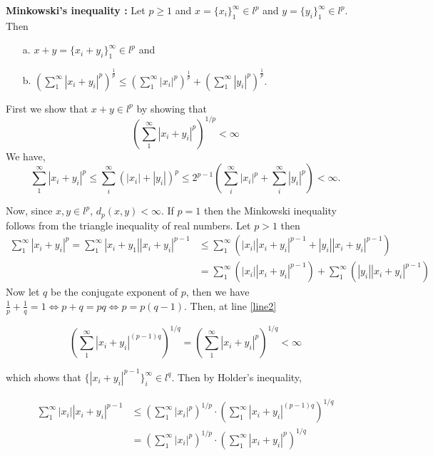 \documentclass[12pt]{article}
\begin{document}
\begin{enumerate}
\begin{mybox}
    \textbf{Minkowski's inequality :} Let $p\geq 1$ and
    $x=\{x_{i}\}_{1}^{\infty} \in l^p$ and
    $y=\{y_{i}\}_{1}^{\infty} \in l^p$. Then

    \begin{enumerate}
        \item[a.]
              $x+y =
              \{x_{i} + y_{i}\}_{1}^{\infty} \in l^{p}$ and
        \item[b.]
        $\left(\sum_{1}^{\infty}{|x_{i} + y_{i}|^p}\right)^
        \frac{1}{p}\leq
        \left(\sum_{1}^{\infty}{|x_{i}|^{p}}\right)^{\frac{1}{p}}
        +
        \left(\sum_{1}^{\infty}{|y_{i}|^{p}}\right)^{\frac{1}{p}}.$
    \end{enumerate}
    First we show that $x+y\in l^p$ by showing that
    $$\left(\sum_{1}^{\infty}{|x_{i} + y_{i}|^p}\right)^{1/p}
    <\infty$$
    We have,
    $$\sum_{1}^{\infty}{|x_{i} + y_{i}|^p}\leq
    \sum_i^{\infty}{\left(|x_i|+|y_i|\right)^p}\leq
    2^{p-1}\left(\sum_i^{\infty}{|x_i|^p}+
    \sum_i^{\infty}{|y_i|^p}\right)<\infty.$$

    Now, since $x,y\in l^p$, $d_p(x,y)<\infty$.
    If $p=1$ then the Minkowski inequality follows from the
    triangle inequality of real numbers. Let $p>1$ then
    \begin{align}\sum_{1}^{\infty}{|x_{i} + y_{i}|^p}=
    \sum_{1}^{\infty}{|x_i+y_1||x_{i} + y_{i}|^{p-1}}
    &\leq\sum_{1}^{\infty}{\left(|x_i||x_{i} + y_{i}|^{p-1}
    +|y_i||x_{i} + y_{i}|^{p-1}\right)}\label{line1}\\
    &=\sum_{1}^{\infty}{\left(|x_i||x_{i} + y_{i}|^{p-1}\right)}
    +\sum_{1}^{\infty}{\left(|y_i||x_{i} + y_{i}|^{p-1}\right)}
    \label{line2}
    \end{align}
    Now let $q$ be the conjugate exponent of $p$, then we have
    $\frac{1}{p}+\frac{1}{q}=1 \iff p+q=pq \iff p=p(q-1)$. Then,
    at line
    \ref{line2}

    $$\left(\sum_{1}^{\infty}{|x_i+y_i|^{(p-1)q}}\right)^{1/q}
    =\left(\sum_{1}^{\infty}{|x_i+y_i|^{p}}\right)^{1/q}
    <\infty$$

    which shows that $\{|x_i+y_i|^{p-1}\}_i^{\infty}\in
    l^q$. Then by Holder's inequality,

    \begin{align}\sum_{1}^{\infty}{|x_i||x_{i} + y_{i}|^{p-1}}
      &\leq \left(\sum_{1}^{\infty}{|x_i|^p}\right)^{1/p}\cdot
      \left(\sum_{1}^{\infty}{|x_i+y_i|^{(p-1)q}}\right)^{1/q}\\
      &=\left(\sum_{1}^{\infty}{|x_i|^p}\right)^{1/p}\cdot
      \left(\sum_{1}^{\infty}{|x_i+y_i|^{p}}\right)^{1/q}
      \label{line4}
    \end{align}


\end{mybox}
\end{enumerate}
\end{document}
